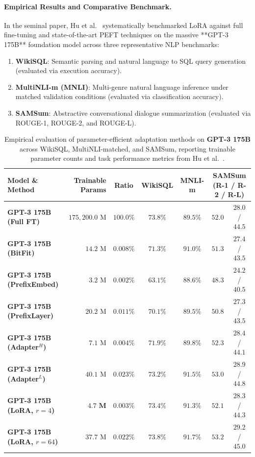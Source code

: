 \documentclass[../../../main.tex]{subfiles}
\begin{document}
\paragraph{Empirical Results and Comparative Benchmark.}
In the seminal paper, Hu et al.~\citep{hu2021lora} systematically benchmarked LoRA against full fine-tuning and state-of-the-art PEFT techniques on the massive **GPT-3 175B** foundation model across three representative NLP benchmarks:
\begin{enumerate}
    \item \textbf{WikiSQL}: Semantic parsing and natural language to SQL query generation (evaluated via execution accuracy).
    \item \textbf{MultiNLI-m (MNLI)}: Multi-genre natural language inference under matched validation conditions (evaluated via classification accuracy).
    \item \textbf{SAMSum}: Abstractive conversational dialogue summarization (evaluated via ROUGE-1, ROUGE-2, and ROUGE-L).
\end{enumerate}

\begin{table}[htbp]
\centering
\small
\caption{Empirical evaluation of parameter-efficient adaptation methods on \textbf{GPT-3 175B} across WikiSQL, MultiNLI-matched, and SAMSum, reporting trainable parameter counts and task performance metrics from Hu et al.~\citep{hu2021lora}.}
\label{tab:lora_gpt3_comparative_results}
\begin{tabularx}{\textwidth}{l r c c c c c}
\toprule
\textbf{Model \& Method} & \textbf{Trainable Params} & \textbf{Ratio} & \textbf{WikiSQL} & \textbf{MNLI-m} & \multicolumn{2}{c}{\textbf{SAMSum (R-1 / R-2 / R-L)}} \\
\midrule
\textbf{GPT-3 175B (Full FT)} 
    & $175{,}200.0\text{ M}$ & $100.0\%$ & $73.8\%$ & $89.5\%$ & $52.0$ & $28.0$ / $44.5$ \\
\addlinespace
\textbf{GPT-3 175B (BitFit)} 
    & $14.2\text{ M}$ & $0.008\%$ & $71.3\%$ & $91.0\%$ & $51.3$ & $27.4$ / $43.5$ \\
\textbf{GPT-3 175B (PrefixEmbed)} 
    & $3.2\text{ M}$ & $0.002\%$ & $63.1\%$ & $88.6\%$ & $48.3$ & $24.2$ / $40.5$ \\
\textbf{GPT-3 175B (PrefixLayer)} 
    & $20.2\text{ M}$ & $0.011\%$ & $70.1\%$ & $89.5\%$ & $50.8$ & $27.3$ / $43.5$ \\
\textbf{GPT-3 175B (Adapter$^H$)} 
    & $7.1\text{ M}$ & $0.004\%$ & $71.9\%$ & $89.8\%$ & $52.3$ & $28.4$ / $44.1$ \\
\textbf{GPT-3 175B (Adapter$^L$)} 
    & $40.1\text{ M}$ & $0.023\%$ & $73.2\%$ & $91.5\%$ & $53.0$ & $28.9$ / $44.8$ \\
\addlinespace
\textbf{GPT-3 175B (LoRA, $r=4$)} 
    & $\mathbf{4.7\text{ M}}$ & $\mathbf{0.003\%}$ & $73.4\%$ & $91.3\%$ & $52.1$ & $28.3$ / $44.3$ \\
\textbf{GPT-3 175B (LoRA, $r=64$)} 
    & $37.7\text{ M}$ & $0.022\%$ & $\mathbf{73.8\%}$ & $\mathbf{91.7\%}$ & $\mathbf{53.2}$ & $\mathbf{29.2}$ / $\mathbf{45.0}$ \\
\bottomrule
\end{tabularx}
\end{table}
\end{document}

